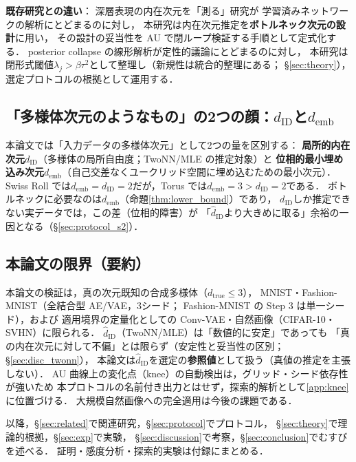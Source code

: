 \documentclass[11pt,a4paper]{jsarticle}
\newcommand{\dID}{d_{\mathrm{ID}}}
\newcommand{\hatdID}{\hat{d}_{\mathrm{ID}}}
\newcommand{\dtrue}{d_{\mathrm{true}}}
\newcommand{\demb}{d_{\mathrm{emb}}}
\begin{document}
\textbf{既存研究との違い}：
深層表現の内在次元を「測る」研究\cite{ansuini2019intrinsic,pope2021intrinsic,valeriani2023geometry}が
学習済みネットワークの解析にとどまるのに対し，
本研究は内在次元推定を\textbf{ボトルネック次元の設計}に用い，
その設計の妥当性を AU で閉ループ検証する手順として定式化する．
posterior collapse の線形解析\cite{lucas2019elbo}が定性的議論にとどまるのに対し，
本研究は閉形式閾値$\lambda_j > \beta\tau^2$として整理し（新規性は統合的整理にある；
§\ref{sec:theory}），選定プロトコルの根拠として運用する．

\subsection{「多様体次元のようなもの」の2つの顔：$\dID$と$\demb$}\label{sec:intro_dim}

本論文では「入力データの多様体次元」として2つの量を区別する：
\textbf{局所的内在次元}$\dID$（多様体の局所自由度；TwoNN/MLE の推定対象）と
\textbf{位相的最小埋め込み次元}$\demb$（自己交差なくユークリッド空間に埋め込むための最小次元）．
Swiss Roll では$\demb = \dID = 2$だが，Torus では$\demb = 3 > \dID = 2$である．
ボトルネックに必要なのは$\demb$（命題\ref{thm:lower_bound}）であり，
$\dID$しか推定できない実データでは，この差（位相的障害）が
「$\hatdID$より大きめに取る」余裕の一因となる（§\ref{sec:protocol_s2}）．

\subsection{本論文の限界（要約）}\label{sec:intro_limits}

本論文の検証は，真の次元既知の合成多様体（$\dtrue \leq 3$），
MNIST・Fashion-MNIST（全結合型 AE/VAE，3シード；
Fashion-MNIST の Step 3 は単一シード），および
適用境界の定量化としての Conv-VAE・自然画像（CIFAR-10・SVHN）に限られる．
$\hatdID$（TwoNN/MLE）は「数値的に安定」であっても
「真の内在次元に対して不偏」とは限らず（安定性と妥当性の区別；§\ref{sec:disc_twonn}），
本論文は$\hatdID$を選定の\textbf{参照値}として扱う（真値の推定を主張しない）．
AU 曲線上の変化点（knee）の自動検出は，グリッド・シード依存性が強いため
本プロトコルの名前付き出力とはせず，探索的解析として\ref{app:knee}に位置づける．
大規模自然画像への完全適用は今後の課題である．

以降，§\ref{sec:related}で関連研究，§\ref{sec:protocol}でプロトコル，
§\ref{sec:theory}で理論的根拠，§\ref{sec:exp}で実験，
§\ref{sec:discussion}で考察，§\ref{sec:conclusion}でむすびを述べる．
証明・感度分析・探索的実験は付録にまとめる．
\end{document}
